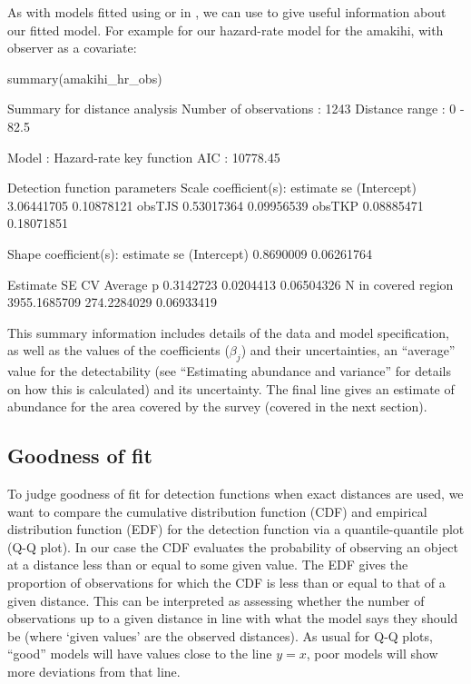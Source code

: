 \documentclass[article]{jss}
\begin{document}
As with models fitted using  or  in , we
can use  to give useful information about our fitted
model. For example for our hazard-rate model for the amakihi, with
observer as a covariate:

\begin{CodeChunk}
\begin{CodeInput}
summary(amakihi_hr_obs)
\end{CodeInput}
\begin{CodeOutput}

Summary for distance analysis 
Number of observations :  1243 
Distance range         :  0  -  82.5 

Model : Hazard-rate key function 
AIC   : 10778.45 

Detection function parameters
Scale coefficient(s):  
              estimate         se
(Intercept) 3.06441705 0.10878121
obsTJS      0.53017364 0.09956539
obsTKP      0.08885471 0.18071851

Shape coefficient(s):  
             estimate         se
(Intercept) 0.8690009 0.06261764

                        Estimate          SE         CV
Average p              0.3142723   0.0204413 0.06504326
N in covered region 3955.1685709 274.2284029 0.06933419
\end{CodeOutput}
\end{CodeChunk}

This summary information includes details of the data and model
specification, as well as the values of the coefficients (\(\beta_j\))
and their uncertainties, an ``average'' value for the detectability (see
``Estimating abundance and variance'' for details on how this is
calculated) and its uncertainty. The final line gives an estimate of
abundance for the area covered by the survey (covered in the next
section).

\subsection{Goodness of fit}\label{goodness-of-fit}

To judge goodness of fit for detection functions when exact distances
are used, we want to compare the cumulative distribution function (CDF)
and empirical distribution function (EDF) for the detection function via
a quantile-quantile plot (Q-Q plot). In our case the CDF evaluates the
probability of observing an object at a distance less than or equal to
some given value. The EDF gives the proportion of observations for which
the CDF is less than or equal to that of a given distance. This can be
interpreted as assessing whether the number of observations up to a
given distance in line with what the model says they should be (where
`given values' are the observed distances). As usual for Q-Q plots,
``good'' models will have values close to the line \(y=x\), poor models
will show more deviations from that line.
\end{document}
